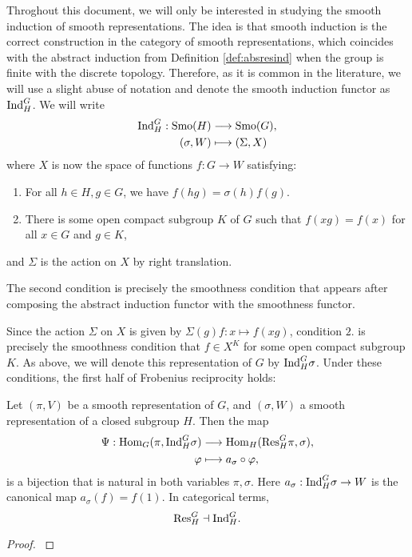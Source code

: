 \begin{rem}
    Throghout this document, we will only be interested in studying the smooth induction of smooth representations. The idea is that smooth induction is the correct construction in the category of smooth representations, which coincides with the abstract induction from Definition \ref{def:absresind} when the group is finite with the discrete topology. Therefore, as it is common in the literature, we will use a slight abuse of notation and denote the smooth induction functor as $\mathrm{Ind}_H^G$. We will write 
    \begin{align*}
        \mathrm{Ind}_H^G:\mathrm{Smo}(H)&\longrightarrow\mathrm{Smo}(G),\\
        (\sigma,W)&\longmapsto(\Sigma,X)
    \end{align*}
    where $X$ is now the space of functions $f:G\to W$ satisfying:
    \begin{enumerate}
        \item For all $h\in H, g\in G$, we have $f(hg) = \sigma(h)f(g)$.
        \item There is some open compact subgroup $K$ of $G$ such that $f(xg)=f(x)$ for all $x\in G$ and $g\in K$,
    \end{enumerate}
    and $\Sigma$ is the action on $X$ by right translation.

    The second condition is precisely the smoothness condition that appears after composing the abstract induction functor with the smoothness functor.
    
\end{rem}

Since the action $\Sigma$ on $X$ is given by $\Sigma(g)f:x\mapsto f(xg)$, condition $2.$ is precisely the smoothness condition that $f\in X^K$ for some open compact subgroup $K$. As above, we will denote this representation of $G$ by $\mathrm{Ind}_H^G\sigma$. Under these conditions, the first half of Frobenius reciprocity holds:

\begin{thm}\label{thm:frob}
	Let $(\pi,V)$ be a smooth representation of $G$, and $(\sigma,W)$ a smooth representation of a closed subgroup $H$. Then the map
	\begin{align*}
		\Psi:\mathrm{Hom}_G(\pi, \mathrm{Ind}_H^G\sigma)&\longrightarrow \mathrm{Hom}_H(\mathrm{Res}_H^G \pi, \sigma),\\
		\varphi &\longmapsto a_\sigma \circ \varphi,
	\end{align*}
    is a bijection that is natural in both variables $\pi,\sigma$. Here $a_\sigma:\mathrm{Ind}_H^G\sigma \to W$ is the canonical map $a_\sigma(f) = f(1)$. In categorical terms,
    $$\mathrm{Res}_H^G\dashv\mathrm{Ind}_H^G.$$
\end{thm}
\begin{proof}
    \cite[2.4 Frobenius Reciprocity]{BH1}
\end{proof}

